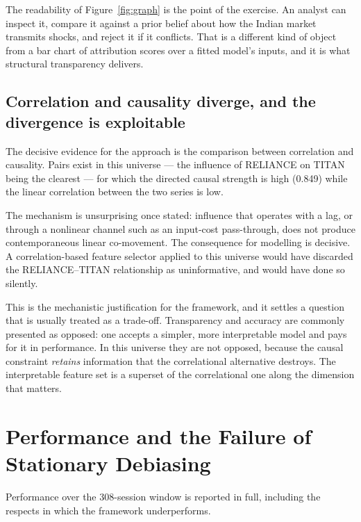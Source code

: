 The readability of Figure~\ref{fig:graph} is the point of the exercise. An analyst can inspect it,
compare it against a prior belief about how the Indian market transmits shocks, and reject it if
it conflicts. That is a different kind of object from a bar chart of attribution scores over a
fitted model's inputs, and it is what structural transparency delivers.

\subsection{Correlation and causality diverge, and the divergence is exploitable}

The decisive evidence for the approach is the comparison between correlation and causality. Pairs
exist in this universe --- the influence of RELIANCE on TITAN being the clearest --- for which the
directed causal strength is high (0.849) while the linear correlation between the two series is
low.

The mechanism is unsurprising once stated: influence that operates with a lag, or through a
nonlinear channel such as an input-cost pass-through, does not produce contemporaneous linear
co-movement. The consequence for modelling is decisive. A correlation-based feature selector
applied to this universe would have discarded the RELIANCE--TITAN relationship as uninformative,
and would have done so silently.

This is the mechanistic justification for the framework, and it settles a question that is usually
treated as a trade-off. Transparency and accuracy are commonly presented as opposed: one accepts a
simpler, more interpretable model and pays for it in performance. In this universe they are not
opposed, because the causal constraint \emph{retains} information that the correlational
alternative destroys. The interpretable feature set is a superset of the correlational one along
the dimension that matters.

\section{Performance and the Failure of Stationary Debiasing}
\label{sec:dchf-perf}

Performance over the 308-session window is reported in full, including the respects in which the
framework underperforms.

